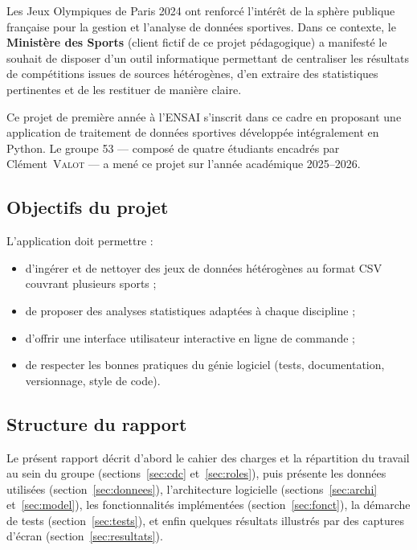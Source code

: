 \documentclass[12pt,a4paper]{article}
\begin{document}
Les Jeux Olympiques de Paris 2024 ont renforcé l'intérêt de la sphère publique
française pour la gestion et l'analyse de données sportives. Dans ce contexte,
le \textbf{Ministère des Sports} (client fictif de ce projet pédagogique) a
manifesté le souhait de disposer d'un outil informatique permettant de
centraliser les résultats de compétitions issues de sources hétérogènes, d'en
extraire des statistiques pertinentes et de les restituer de manière claire.

Ce projet de première année à l'ENSAI s'inscrit dans ce cadre en proposant une
application de traitement de données sportives développée intégralement en
Python. Le groupe 53 --- composé de quatre étudiants encadrés par
Clément~\textsc{Valot} --- a mené ce projet sur l'année académique 2025--2026.

\subsection{Objectifs du projet}

L'application doit permettre :
\begin{itemize}
  \item d'ingérer et de nettoyer des jeux de données hétérogènes au format CSV
        couvrant plusieurs sports ;
  \item de proposer des analyses statistiques adaptées à chaque discipline ;
  \item d'offrir une interface utilisateur interactive en ligne de commande ;
  \item de respecter les bonnes pratiques du génie logiciel (tests, documentation,
        versionnage, style de code).
\end{itemize}

\subsection{Structure du rapport}

Le présent rapport décrit d'abord le cahier des charges et la répartition du
travail au sein du groupe (sections~\ref{sec:cdc} et~\ref{sec:roles}), puis
présente les données utilisées (section~\ref{sec:donnees}), l'architecture
logicielle (sections~\ref{sec:archi} et~\ref{sec:model}), les fonctionnalités
implémentées (section~\ref{sec:fonct}), la démarche de tests
(section~\ref{sec:tests}), et enfin quelques résultats illustrés par des
captures d'écran (section~\ref{sec:resultats}).

\end{document}

